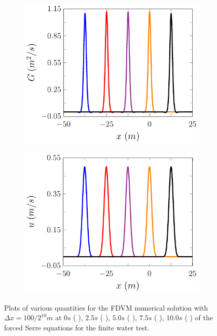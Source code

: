 \begin{figure}
\begin{subfigure}{0.5\textwidth}
		\vspace{0.5cm}
	\end{subfigure}
	\begin{subfigure}{0.5\textwidth}
		\includegraphics[width=\textwidth]{./chp5/figures/Forced/Wet/FDVMExG.pdf}
		\vspace{0.5cm}
	\end{subfigure}%
	\begin{subfigure}{0.5\textwidth}
		\includegraphics[width=\textwidth]{./chp5/figures/Forced/Wet/FDVMExu.pdf}
		\vspace{0.5cm}
	\end{subfigure}
	\caption{Plots of various quantities for the FDVM numerical solution with $\Delta x = 100/ 2^{10} m$ at $0s$ ({\color{blue} \solidrule}), $2.5s$ ({\color{red} \solidrule}), $5.0s$ ({\color{violet!80!white} \solidrule}), $7.5s$ ({\color{orange} \solidrule}), $10.0s$ ({\color{black} \solidrule}) of the forced Serre equations for the finite water test.}
	\label{fig:ForcedWetFDVMP2PExAll}
\end{figure}


